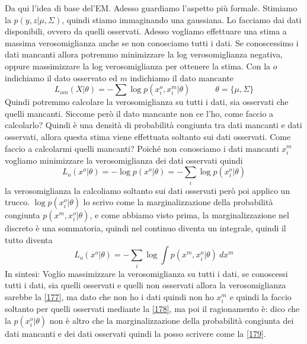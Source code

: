 \noindent Da qui l'idea di base del'EM. Adesso guardiamo l'aspetto più formale. Stimiamo la $p(y,z|\mu, \Sigma)$, quindi stiamo immaginando una gaussiana. Lo facciamo dai dati disponibili, ovvero da quelli osservati. Adesso vogliamo effettuare una stima a massima verosomiglianza anche se non conosciamo tutti i dati. Se conoscessimo i dati mancanti allora potremmo minimizzare la log verosomiglianza negativa, oppure massimizzare la log verosomiglianza per ottenere la stima. Con la $o$ indichiamo il dato osservato ed $m$ indichiamo il dato mancante
\begin{equation}\label{177}
L_{om}(X|\theta) = - \sum \log p(x_i^o, x_i^m | \theta) \quad \quad \quad \theta = \{\mu, \Sigma\} 
\end{equation}
Quindi potremmo calcolare la verosomiglianza su tutti i dati, sia osservati che quelli mancanti. Siccome però il dato mancante non ce l'ho, come faccio a calcolarlo? Quindi è una densità di probabilità congiunta tra dati mancanti e dati osservati, allora questa stima viene effettuata soltanto sui dati osservati. Come faccio a calcolarmi quelli mancanti? Poiché non conosciamo i dati mancanti $x_i^m$ vogliamo minimizzare la verosomiglianza dei dati osservati quindi
\begin{equation}\label{178}
L_o(x^o | \theta) = - \log p(x^o | \theta) = - \sum_i \log p(x_i^o | \theta)
\end{equation}
la verosomiglianza la calcoliamo soltanto sui dati osservati però poi applico un trucco. $\log p(x_i^o | \theta)$ lo scrivo come la marginalizzazione della probabilità congiunta $p(x^m, x_i^o | \theta)$, e come abbiamo visto prima, la marginalizzazione nel discreto è una sommatoria, quindi nel continuo diventa un integrale, quindi il tutto diventa
\begin{equation}\label{179}
L_o(x^o | \theta) = -\sum_i \log \int p(x^m, x_i^o | \theta) \ dx^m
\end{equation}
In sintesi: Voglio massimizzare la verosomiglianza su tutti i dati, se conoscessi tutti i dati, sia quelli osservati e quelli non osservati allora la verosomiglianza sarebbe la \ref{177}, ma dato che non ho i dati quindi non ho $x_i^m$ e quindi la faccio soltanto per quelli osservati mediante la \ref{178}, ma poi il ragionamento è: dico che la $p(x_i^o | \theta)$ non è altro che la marginalizzazione della probabilità congiunta dei dati mancanti e dei dati osservati quindi la posso scrivere come la \ref{179}.\\


